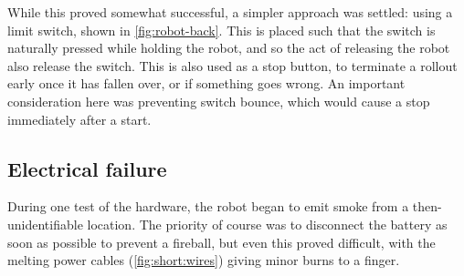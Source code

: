 \documentclass[main.tex]{subfiles}
\begin{document}
	While this proved somewhat successful, a simpler approach was settled: using a limit switch, shown in \cref{fig:robot-back}.
	This is placed such that the switch is naturally pressed while holding the robot, and so the act of releasing the robot also release the switch.
	This is also used as a stop button, to terminate a rollout early once it has fallen over, or if something goes wrong\footnotemark.
	An important consideration here was preventing switch bounce, which would cause a stop immediately after a start.


\subsection{Electrical failure}
	\label{sec:electrical:failure}

	During one test of the hardware, the robot began to emit smoke from a then-unidentifiable location. The priority of course was to disconnect the battery as soon as possible to prevent a fireball, but even this proved difficult, with the melting power cables (\cref{fig:short:wires}) giving minor burns to a finger.
\end{document}

